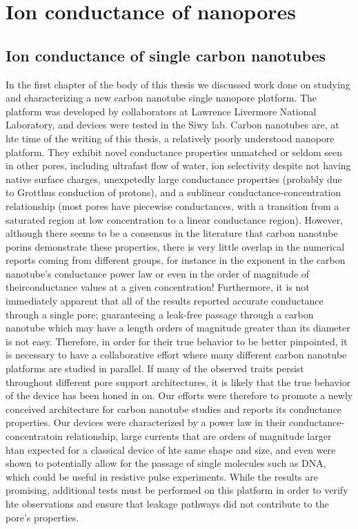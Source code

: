 \section{Ion conductance of nanopores}

	\subsection{Ion conductance of single carbon nanotubes}
	
		In the first chapter of the body of this thesis we discussed work done on studying and characterizing a new carbon nanotube single nanopore platform. The platform was developed by collaborators at Lawrence Livermore National Laboratory, and devices were tested in the Siwy lab. Carbon nanotubes are, at hte time of the writing of this thesis, a relatively poorly understood nanopore platform. They exhibit novel conductance properties unmatched or seldom seen in other pores, including ultrafast flow of water, ion selectivity despite not having native surface charges, unexpetedly large conductance properties (probably due to Grotthus conduction of protons), and a sublinear conductance-concentration relationship (most pores have piecewise conductances, with a transition from a saturated region at low concentration to a linear conductance region). However, although there seems to be a consensus in the literature that carbon nanotube porins demonstrate these properties, there is very little overlap in the numerical reports coming from different groups, for instance in the exponent in the carbon nanotube's conductance power law or even in the order of magnitude of theirconductance values at a given concentration! Furthermore, it is not immediately apparent that all of the results reported accurate conductance through a single pore; guaranteeing a leak-free passage through a carbon nanotube which may have a length orders of magnitude greater than its diameter is not easy. Therefore, in order for their true behavior to be better pinpointed, it is necessary to have a collaborative effort where many different carbon nanotube platforms are studied in parallel. If many of the observed traits persist throughout different pore support architectures, it is likely that the true behavior of the device has been honed in on. Our efforts were therefore to promote a newly conceived architecture for carbon nanotube studies and reports its conductance properties. Our devices were characterized by a power law in their conductance-concentratoin relationship, large currents that are orders of magnitude larger htan expected for a classical device of hte same shape and size, and even were shown to potentially allow for the passage of single molecules such as DNA, which could be useful in resistive pulse experiments. While the results are promising, additional tests must be performed on this platform in order to verify hte observations and ensure that leakage pathways did not contribute to the pore's properties.
		  
